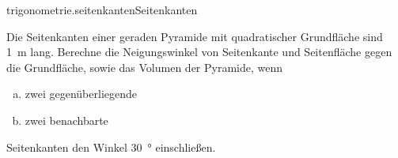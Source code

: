 \begin{exercise}{trigonometrie.seitenkanten}{Seitenkanten}
  \ifproblem\problem\par
    Die Seitenkanten einer geraden Pyramide mit quadratischer
    Grundfläche sind \SI{1}{\metre} lang. Berechne die
    Neigungswinkel von Seitenkante und Seitenfläche gegen
    die Grundfläche, sowie das Volumen der Pyramide, wenn
    \begin{enumerate}[a)]
      \item zwei gegenüberliegende
      \item zwei benachbarte
    \end{enumerate}
    Seitenkanten den Winkel \SI{30}{\degree} einschließen.
  \fi
\end{exercise}
